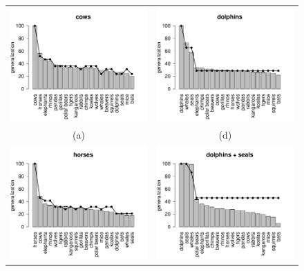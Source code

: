 \documentclass[doc,floatsintext]{apa6}
\begin{document}
\begin{figure}[p]
\begin{center}
\begin{tabular}{cc}
	\includegraphics[width=6.5cm]{generalization_figs/cows.pdf} &
	\includegraphics[width=6.5cm]{generalization_figs/dolphins.pdf} \\
	(a) & (d) \\
	\includegraphics[width=6.5cm]{generalization_figs/horses.pdf} &
	\includegraphics[width=6.5cm]{generalization_figs/dolphinsseals.pdf} \\

\end{tabular}
\end{center}
\end{figure}
\end{document}
